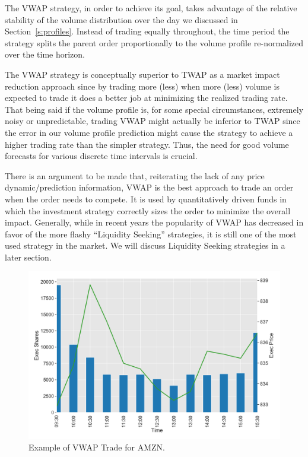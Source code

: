 The VWAP strategy, in order to achieve its goal, takes advantage of the relative stability of the volume distribution over the day we discussed in Section~\ref{s:profiles}. Instead of trading equally throughout, the time period the strategy splits the parent order proportionally to the volume profile re-normalized over the time horizon.


The VWAP strategy is conceptually superior to TWAP as a market impact reduction approach since by trading more (less) when more  (less) volume is expected to trade it does a better job at minimizing the realized trading rate. That being said if the volume profile is, for some special circumstances, extremely noisy or unpredictable, trading VWAP might actually be inferior to TWAP since the error in our volume profile prediction might cause the strategy to achieve a higher trading rate than the simpler strategy. Thus, the need for good volume forecasts for various discrete time intervals is crucial.


There is an argument to be made that, reiterating the lack of any price dynamic/prediction information, VWAP is the best approach to trade an order when the order needs to compete. It is used by quantitatively driven funds in which the investment strategy correctly sizes the order to minimize the overall impact. Generally, while in recent years the popularity of VWAP has decreased in favor of the more flashy ``Liquidity Seeking'' strategies, it is still one of the most used strategy in the market. We will discuss Liquidity Seeking strategies in a later section. \label{in:twap2} \twomedskip


        \begin{figure}[!ht]
        \centering
        \includegraphics[width=\textwidth]{chapters/chapter_exec_models/figures/vwap.png} 
        \caption{Example of VWAP Trade for AMZN.\label{fig:vwap_amzn}}
        \end{figure}


